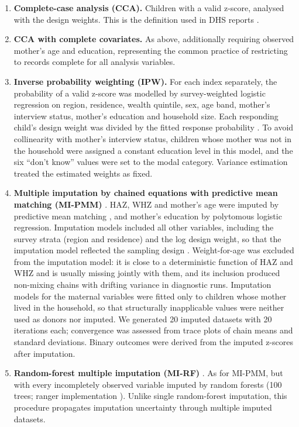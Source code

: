 \documentclass[11pt,a4paper]{article}
\providecommand{\tightlist}{\setlength{\itemsep}{0pt}\setlength{\parskip}{0pt}}
\begin{document}
\begin{enumerate}
\def\labelenumi{\arabic{enumi}.}
\tightlist
\item
  \textbf{Complete-case analysis (CCA).} Children with a valid z-score,
  analysed with the design weights. This is the definition used in DHS
  reports \cite{croft2023guide}.
\item
  \textbf{CCA with complete covariates.} As above, additionally
  requiring observed mother's age and education, representing the common
  practice of restricting to records complete for all analysis
  variables.
\item
  \textbf{Inverse probability weighting (IPW).} For each index
  separately, the probability of a valid z-score was modelled by
  survey-weighted logistic regression on region, residence, wealth
  quintile, sex, age band, mother's interview status, mother's education
  and household size. Each responding child's design weight was divided
  by the fitted response probability \cite{seaman2013review}. To avoid
  collinearity with mother's interview status, children whose mother was
  not in the household were assigned a constant education level in this
  model, and the six ``don't know'' values were set to the modal
  category. Variance estimation treated the estimated weights as fixed.
\item
  \textbf{Multiple imputation by chained equations with predictive mean
  matching (MI-PMM)} \cite{vanbuuren2011mice,white2011multiple}. HAZ,
  WHZ and mother's age were imputed by predictive mean matching
  \cite{morris2014tuning}, and mother's education by polytomous logistic
  regression. Imputation models included all other variables, including
  the survey strata (region and residence) and the log design weight, so
  that the imputation model reflected the sampling design
  \cite{reiter2006importance}. Weight-for-age was excluded from the
  imputation model: it is close to a deterministic function of HAZ and
  WHZ and is usually missing jointly with them, and its inclusion
  produced non-mixing chains with drifting variance in diagnostic runs.
  Imputation models for the maternal variables were fitted only to
  children whose mother lived in the household, so that structurally
  inapplicable values were neither used as donors nor imputed. We
  generated 20 imputed datasets with 20 iterations each; convergence was
  assessed from trace plots of chain means and standard deviations.
  Binary outcomes were derived from the imputed z-scores after
  imputation.
\item
  \textbf{Random-forest multiple imputation (MI-RF)}
  \cite{doove2014recursive,shah2014comparison}. As for MI-PMM, but with
  every incompletely observed variable imputed by random forests (100
  trees; ranger implementation \cite{wright2017ranger}). Unlike single
  random-forest imputation, this procedure propagates imputation
  uncertainty through multiple imputed datasets.
\end{enumerate}
\end{document}
